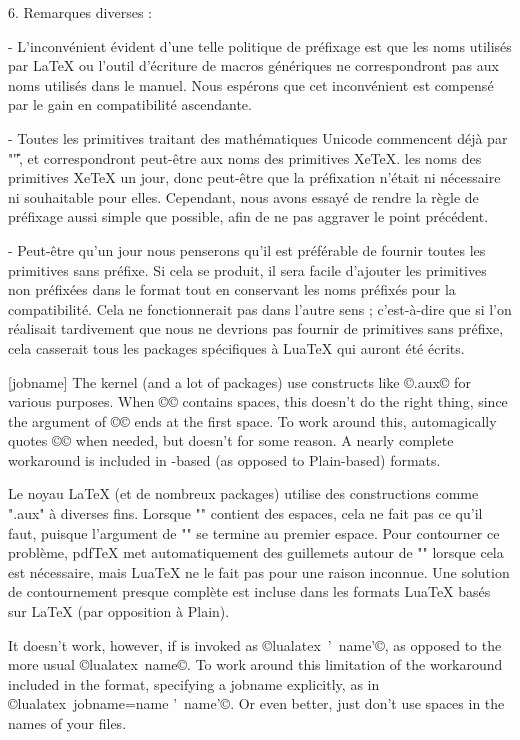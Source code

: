 \documentclass{lltxdoc}
\begin{document}
6. Remarques diverses :

- L'inconvénient évident d'une telle politique de préfixage est que les noms utilisés par LaTeX ou l'outil d'écriture de macros génériques ne correspondront pas aux noms utilisés dans le manuel. Nous espérons que cet inconvénient est compensé par le gain en compatibilité ascendante.

- Toutes les primitives traitant des mathématiques Unicode commencent déjà par "\U", et correspondront peut-être aux noms des primitives XeTeX. les noms des primitives XeTeX un jour, donc peut-être que la préfixation n'était ni nécessaire ni souhaitable pour elles. Cependant, nous avons essayé de rendre la règle de préfixage aussi simple que possible, afin de ne pas aggraver le point précédent.

- Peut-être qu'un jour nous penserons qu'il est préférable de fournir toutes les primitives sans préfixe. Si cela se produit, il sera facile d'ajouter les primitives non préfixées dans le format tout en conservant les noms préfixés pour la compatibilité. Cela ne fonctionnerait pas dans l'autre sens ; c'est-à-dire que si l'on réalisait tardivement que nous ne devrions pas fournir de primitives sans préfixe, cela casserait tous les packages spécifiques à LuaTeX qui auront été écrits.

[jobname]
The \latex kernel (and a lot of packages) use constructs like
©\jobname.aux© for various purposes. When ©\jobname© contains spaces,
this doesn't do the right thing, since the argument of ©© ends at the
first space. To work around this, \pdftex automagically quotes ©\jobname© when
needed, but \luatex doesn't for some reason. A nearly complete workaround is
included in \latex-based (as opposed to Plain-based) \luatex formats.

Le noyau LaTeX (et de nombreux packages) utilise des constructions comme "\jobname.aux" à diverses fins. Lorsque "\jobname" contient des espaces, cela ne fait pas ce qu'il faut, puisque l'argument de "" se termine au premier espace. Pour contourner ce problème, pdfTeX met automatiquement des guillemets autour de "\jobname" lorsque cela est nécessaire, mais LuaTeX ne le fait pas pour une raison inconnue. Une solution de contournement presque complète est incluse dans les formats LuaTeX basés sur LaTeX (par opposition à Plain).

It doesn't work, however, if \luatex is invoked as ©lualatex ' name'©,
as opposed to the more usual ©lualatex name©. To work around this
limitation of the workaround included in the format, specifying a jobname
explicitly, as in ©lualatex jobname=name ' name'©. Or even better, just
don't use spaces in the names of your \tex files.
\end{document}
